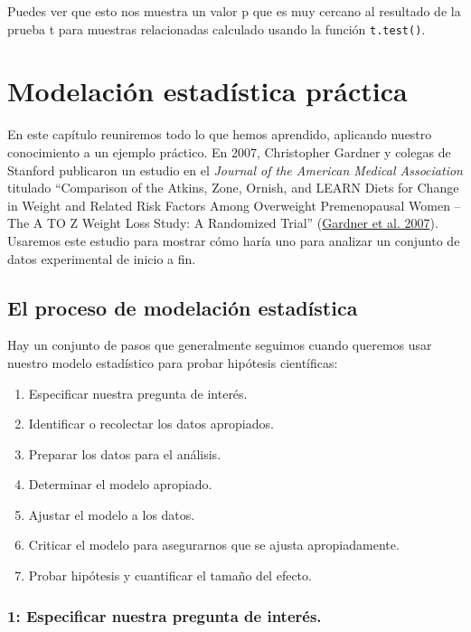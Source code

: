 \documentclass[
  12pt,
]{book}
\providecommand{\tightlist}{%
  \setlength{\itemsep}{0pt}\setlength{\parskip}{0pt}}
\theoremstyle{definition}
\theoremstyle{definition}
\theoremstyle{definition}
\theoremstyle{remark}
\begin{document}
Puedes ver que esto nos muestra un valor p que es muy cercano al resultado de la prueba t para muestras relacionadas calculado usando la función \texttt{t.test()}.

\hypertarget{practical-example}{%
\chapter{Modelación estadística práctica}\label{practical-example}}

En este capítulo reuniremos todo lo que hemos aprendido, aplicando nuestro conocimiento a un ejemplo práctico. En 2007, Christopher Gardner y colegas de Stanford publicaron un estudio en el \emph{Journal of the American Medical Association} titulado ``Comparison of the Atkins, Zone, Ornish, and LEARN Diets for Change in Weight and Related Risk Factors Among Overweight Premenopausal Women -- The A TO Z Weight Loss Study: A Randomized Trial'' (\protect\hyperlink{ref-gard:kiaz:alha:2007}{Gardner et al. 2007}). Usaremos este estudio para mostrar cómo haría uno para analizar un conjunto de datos experimental de inicio a fin.

\hypertarget{el-proceso-de-modelaciuxf3n-estaduxedstica}{%
\section{El proceso de modelación estadística}\label{el-proceso-de-modelaciuxf3n-estaduxedstica}}

Hay un conjunto de pasos que generalmente seguimos cuando queremos usar nuestro modelo estadístico para probar hipótesis científicas:

\begin{enumerate}
\def\labelenumi{\arabic{enumi}.}
\tightlist
\item
  Especificar nuestra pregunta de interés.
\item
  Identificar o recolectar los datos apropiados.
\item
  Preparar los datos para el análisis.
\item
  Determinar el modelo apropiado.
\item
  Ajustar el modelo a los datos.
\item
  Criticar el modelo para asegurarnos que se ajusta apropiadamente.
\item
  Probar hipótesis y cuantificar el tamaño del efecto.
\end{enumerate}

\hypertarget{especificar-nuestra-pregunta-de-interuxe9s.}{%
\subsection{1: Especificar nuestra pregunta de interés.}\label{especificar-nuestra-pregunta-de-interuxe9s.}}
\end{document}
